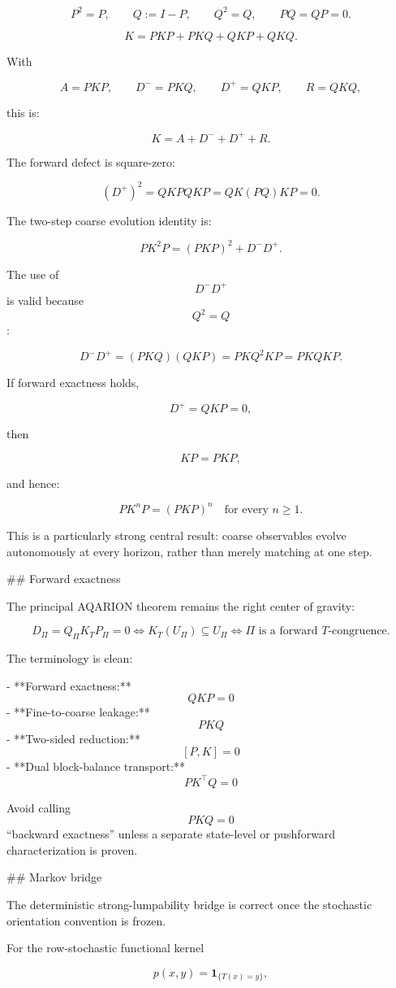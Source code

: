 $$
P^2=P,\qquad Q:=I-P,\qquad Q^2=Q,\qquad PQ=QP=0.
$$

$$
K=PKP+PKQ+QKP+QKQ.
$$

With

$$
A=PKP,\qquad
D^-=PKQ,\qquad
D^+=QKP,\qquad
R=QKQ,
$$

this is:

$$
K=A+D^-+D^++R.
$$

The forward defect is square-zero:

$$
(D^+)^2
=
QKPQKP
=
QK(PQ)KP
=
0.
$$

The two-step coarse evolution identity is:

$$
\boxed{
PK^2P=(PKP)^2+D^-D^+.
}
$$

The use of $$D^-D^+$$ is valid because $$Q^2=Q$$:

$$
D^-D^+
=
(PKQ)(QKP)
=
PKQ^2KP
=
PKQKP.
$$

If forward exactness holds,

$$
D^+=QKP=0,
$$

then

$$
KP=PKP,
$$

and hence:

$$
\boxed{
PK^nP=(PKP)^n
\quad\text{for every }n\ge1.
}
$$

This is a particularly strong central result: coarse observables evolve autonomously at every horizon, rather than merely matching at one step.

## Forward exactness

The principal AQARION theorem remains the right center of gravity:

$$
\boxed{
D_\Pi=Q_\Pi K_TP_\Pi=0
\iff
K_T(U_\Pi)\subseteq U_\Pi
\iff
\Pi\text{ is a forward }T\text{-congruence}.
}
$$

The terminology is clean:

- **Forward exactness:** $$QKP=0$$
- **Fine-to-coarse leakage:** $$PKQ$$
- **Two-sided reduction:** $$[P,K]=0$$
- **Dual block-balance transport:** $$PK^\top Q=0$$

Avoid calling $$PKQ=0$$ “backward exactness” unless a separate state-level or pushforward characterization is proven.

## Markov bridge

The deterministic strong-lumpability bridge is correct once the stochastic orientation convention is frozen.

For the row-stochastic functional kernel

$$
p(x,y)=\mathbf 1_{\{T(x)=y\}},
$$

